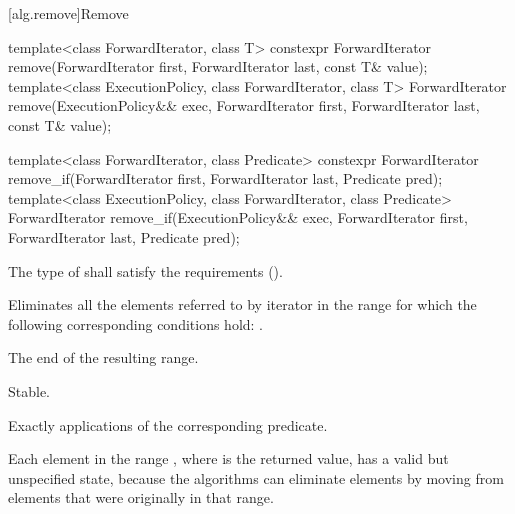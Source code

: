 [alg.remove]{Remove}

%
%
\begin{itemdecl}
template<class ForwardIterator, class T>
  constexpr ForwardIterator remove(ForwardIterator first, ForwardIterator last,
                                   const T& value);
template<class ExecutionPolicy, class ForwardIterator, class T>
  ForwardIterator remove(ExecutionPolicy&& exec,
                         ForwardIterator first, ForwardIterator last,
                         const T& value);

template<class ForwardIterator, class Predicate>
  constexpr ForwardIterator remove_if(ForwardIterator first, ForwardIterator last,
                                      Predicate pred);
template<class ExecutionPolicy, class ForwardIterator, class Predicate>
  ForwardIterator remove_if(ExecutionPolicy&& exec,
                            ForwardIterator first, ForwardIterator last,
                            Predicate pred);
\end{itemdecl}

\begin{itemdescr}
\pnum
\requires
The type of
shall satisfy the 
requirements ().

\pnum
\effects
Eliminates all the elements referred to by iterator
in the range 
for which the following corresponding conditions hold:
.

\pnum
\returns
The end of the resulting range.

\pnum
\remarks Stable.

\pnum
\complexity
Exactly
applications of the corresponding predicate.

\pnum
\begin{note}
Each element in the range , where  is
the returned value, has a valid but unspecified state, because the algorithms
can eliminate elements by moving from elements that were originally
in that range.
\end{note}
\end{itemdescr}

